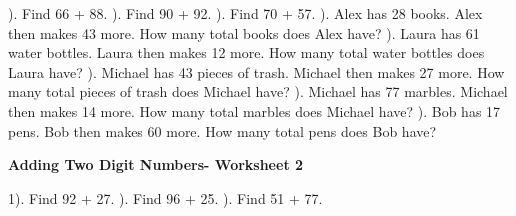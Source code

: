 \documentclass{article}%
\begin{document}
). Find 66 + 88.%
\newline%
\newline%
). Find 90 + 92.%
\newline%
\newline%
). Find 70 + 57.%
\newline%
\newline%
). Alex has 28 books. Alex then makes 43 more. How many total books does Alex have?%
\newline%
\newline%
). Laura has 61 water bottles. Laura then makes 12 more. How many total water bottles does Laura have?%
\newline%
\newline%
). Michael has 43 pieces of trash. Michael then makes 27 more. How many total pieces of trash does Michael have?%
\newline%
\newline%
). Michael has 77 marbles. Michael then makes 14 more. How many total marbles does Michael have?%
\newline%
\newline%
). Bob has 17 pens. Bob then makes 60 more. How many total pens does Bob have?%
\newline%
\newline%
\newline%
\pagebreak%
\large%
\begin{center}%
\textbf{Adding Two Digit Numbers- Worksheet 2}%
\newline%
\newline%
\newline%
\end{center} \normalsize%
1). Find 92 + 27.%
\newline%
\newline%
). Find 96 + 25.%
\newline%
\newline%
). Find 51 + 77.%
\newline%
\newline%
\newline%
\end{document}
